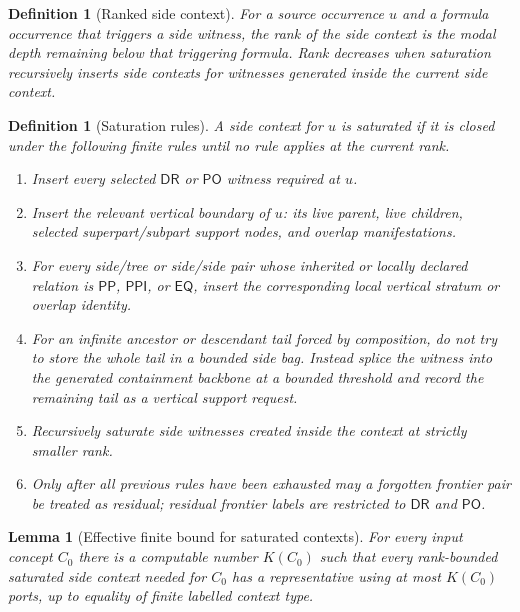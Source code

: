 \documentclass[11pt]{article}
\newtheorem{lemma}[theorem]{Lemma}
\newtheorem{definition}[theorem]{Definition}
\newcommand{\EQ}{\mathsf{EQ}}
\newcommand{\PP}{\mathsf{PP}}
\newcommand{\PPI}{\mathsf{PPI}}
\newcommand{\PO}{\mathsf{PO}}
\newcommand{\DR}{\mathsf{DR}}
\begin{document}
\begin{definition}[Ranked side context]
For a source occurrence $u$ and a formula occurrence that triggers a side witness, the rank of the side context is the modal depth remaining below that triggering formula.  Rank decreases when saturation recursively inserts side contexts for witnesses generated inside the current side context.
\end{definition}

\begin{definition}[Saturation rules]
A side context for $u$ is saturated if it is closed under the following finite rules until no rule applies at the current rank.
\begin{enumerate}[label=(S\arabic*)]
\item Insert every selected $\DR$ or $\PO$ witness required at $u$.
\item Insert the relevant vertical boundary of $u$: its live parent, live children, selected superpart/subpart support nodes, and overlap manifestations.
\item For every side/tree or side/side pair whose inherited or locally declared relation is $\PP$, $\PPI$, or $\EQ$, insert the corresponding local vertical stratum or overlap identity.
\item For an infinite ancestor or descendant tail forced by composition, do not try to store the whole tail in a bounded side bag.  Instead splice the witness into the generated containment backbone at a bounded threshold and record the remaining tail as a vertical support request.
\item Recursively saturate side witnesses created inside the context at strictly smaller rank.
\item Only after all previous rules have been exhausted may a forgotten frontier pair be treated as residual; residual frontier labels are restricted to $\DR$ and $\PO$.
\end{enumerate}
\end{definition}

\begin{lemma}[Effective finite bound for saturated contexts]\label{lem:K-bound}
For every input concept $C_0$ there is a computable number $K(C_0)$ such that every rank-bounded saturated side context needed for $C_0$ has a representative using at most $K(C_0)$ ports, up to equality of finite labelled context type.
\end{lemma}
\end{document}
